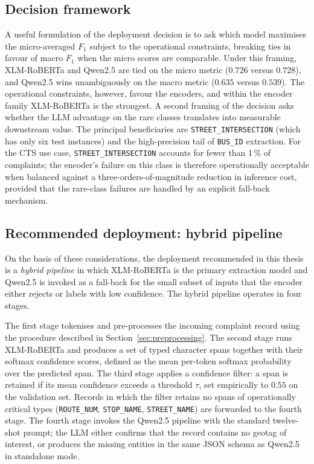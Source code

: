 \subsection{Decision framework}
\label{sec:decision_framework}

A useful formulation of the deployment decision is to ask which model maximises the micro-averaged $F_1$ subject to the operational constraints, breaking ties in favour of macro $F_1$ when the micro scores are comparable. Under this framing, XLM-RoBERTa and Qwen2.5 are tied on the micro metric ($0.726$ versus $0.728$), and Qwen2.5 wins unambiguously on the macro metric ($0.635$ versus $0.539$). The operational constraints, however, favour the encoders, and within the encoder family XLM-RoBERTa is the strongest. A second framing of the decision asks whether the LLM advantage on the rare classes translates into measurable downstream value. The principal beneficiaries are \texttt{STREET\_INTERSECTION} (which has only six test instances) and the high-precision tail of \texttt{BUS\_ID} extraction. For the CTS use case, \texttt{STREET\_INTERSECTION} accounts for fewer than $1\,\%$ of complaints; the encoder's failure on this class is therefore operationally acceptable when balanced against a three-orders-of-magnitude reduction in inference cost, provided that the rare-class failures are handled by an explicit fall-back mechanism.

\subsection{Recommended deployment: hybrid pipeline}
\label{sec:hybrid_pipeline}

On the basis of these considerations, the deployment recommended in this thesis is a \emph{hybrid pipeline} in which XLM-RoBERTa is the primary extraction model and Qwen2.5 is invoked as a fall-back for the small subset of inputs that the encoder either rejects or labels with low confidence. The hybrid pipeline operates in four stages.

The first stage tokenises and pre-processes the incoming complaint record using the procedure described in Section~\ref{sec:preprocessing}. The second stage runs XLM-RoBERTa and produces a set of typed character spans together with their softmax confidence scores, defined as the mean per-token softmax probability over the predicted span. The third stage applies a confidence filter: a span is retained if its mean confidence exceeds a threshold $\tau$, set empirically to $0.55$ on the validation set. Records in which the filter retains no spans of operationally critical types (\texttt{ROUTE\_NUM}, \texttt{STOP\_NAME}, \texttt{STREET\_NAME}) are forwarded to the fourth stage. The fourth stage invokes the Qwen2.5 pipeline with the standard twelve-shot prompt; the LLM either confirms that the record contains no geotag of interest, or produces the missing entities in the same JSON schema as Qwen2.5 in standalone mode.

